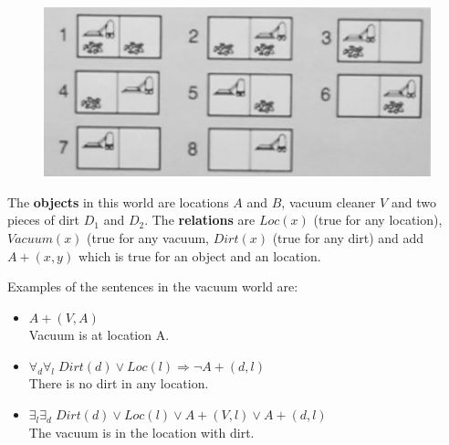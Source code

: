 \documentclass[a4paper,10pt]{article}
\begin{document}
\begin{figure}[h!]
\centering
\includegraphics[height=0.3\textwidth]{vacuum_world.png}
\end{figure}

The \textbf{objects} in this world are locations $A$ and $B$, vacuum cleaner $V$ and two pieces of dirt $D_1$ and $D_2$. The \textbf{relations } are $Loc(x)$ (true for any location), $Vacuum(x)$ (true for any vacuum, $Dirt(x)$ (true for any dirt) and add $A+(x,y)$ which is true for an object and an location.

Examples of the sentences in the vacuum world are:
\begin{itemize}
\setlength{\itemsep}{0pt}
\setlength{\parskip}{0pt}
\setlength{\parsep}{0pt}
\item $A+(V,A)$ \\Vacuum is at location A.
\item $\forall_d \forall_l \; Dirt(d) \vee Loc(l) \Rightarrow \lnot A+(d,l)$ \\There is no dirt in any location.
\item $\exists_l \exists_d \; Dirt(d) \vee Loc(l) \vee A+(V,l) \vee A+(d,l) $ \\The vacuum is in the location with dirt.
\end{itemize}
\end{document}
